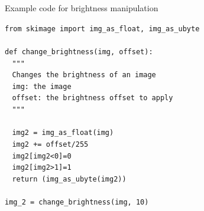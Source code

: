 \documentclass[9pt, aspectratio=169]{beamer}
\begin{document}
\begin{frame}
    {Example code for brightness manipulation}
    \begin{codebox}
        \texttt{from skimage import img\_as\_float, img\_as\_ubyte\\
            \\
            def change\_brightness(img, offset):\\
            $~~~~$"""\\
            $~~~~$Changes the brightness of an image\\
            $~~~~$img: the image\\
            $~~~~$offset: the brightness offset to apply\\
            $~~~~$"""\\
            \\
            $~~~~$img2 = img\_as\_float(img)\\
            $~~~~$img2 += offset/255\\
            $~~~~$img2[img2<0]=0\\
            $~~~~$img2[img2>1]=1\\
            $~~~~$return (img\_as\_ubyte(img2))\\
            \\
            img\_2 = change\_brightness(img, 10)
        }
    \end{codebox}
\end{frame}
\end{document}
